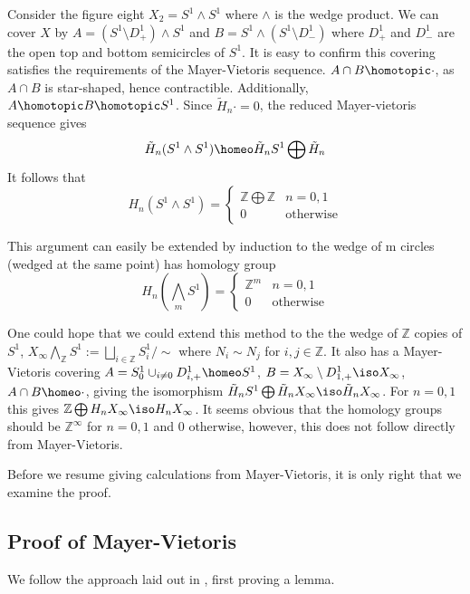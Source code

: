 \begin{example}
Consider the figure eight $X_2=S^1\wedge S^1$ where $\wedge$ is the wedge product. We can cover $X$ by $A=(S^1\setminus D^1_+)\wedge S^1$ and $B=S^1\wedge(S^1\setminus D^1_-)$ where $D^1_+$ and $D^1_-$ are the open top and bottom semicircles of $S^1$. It is easy to confirm this covering satisfies the requirements of the Mayer-Vietoris sequence. $A\cap B \homotopic \cdot$, as $A\cap B$ is star-shaped, hence contractible. Additionally, $A\homotopic B \homotopic S^1$. Since $\tilde{H}_n \cdot=0$, the reduced Mayer-vietoris sequence gives
$$\tilde{H}_n (S^1\wedge S^1) \homeo \tilde{H}_n S^1\bigoplus \tilde{H}_n$$
It follows that
$$H_n(S^1\wedge S^1)=
\begin{cases}
\mathbb{Z}\bigoplus \mathbb{Z} & n= 0,1\\
0 & \text{otherwise}
\end{cases}$$

This argument can easily be extended by induction to the wedge of m circles (wedged at the same point) has homology group 
$$H_n(\bigwedge_m S^1)=
\begin{cases}
\mathbb{Z}^m & n= 0,1\\
0 & \text{otherwise}
\end{cases}$$
\end{example}

\begin{remark}
One could hope that we could extend this method to the the wedge of $\mathbb{Z}$ copies of $S^1$, $X_{\infty}\bigwedge_{\mathbb{Z}} S^1:=\bigsqcup_{i\in \mathbb{Z}} S^1_i/\sim$ where $N_i \sim N_{j}$ for $i,j\in \mathbb{Z}$. It also has a Mayer-Vietoris covering $A=S^1_0\cup_{i\neq 0} D^1_{i,+}\homeo S^1$, $B=X_{\infty}\setminus D^1_{1,+}\iso X_{\infty}$, $A\cap B \homeo \cdot$, giving the isomorphism $\tilde{H}_n S^1 \bigoplus \tilde{H}_n X_{\infty} \iso \tilde{H}_n X_{\infty}$. For $n=0,1$ this gives $\mathbb{Z} \bigoplus H_n X_{\infty} \iso H_n X_{\infty}$. It seems obvious that the homology groups should be $\mathbb{Z}^{\infty}$ for $n=0,1$ and $0$ otherwise, however, this does not follow directly from Mayer-Vietoris.
\end{remark}

Before we resume giving calculations from Mayer-Vietoris, it is only right that we examine the proof.

\subsection{Proof of Mayer-Vietoris}
We follow the approach laid out in \cite{Hatcher}, first proving a lemma. 

